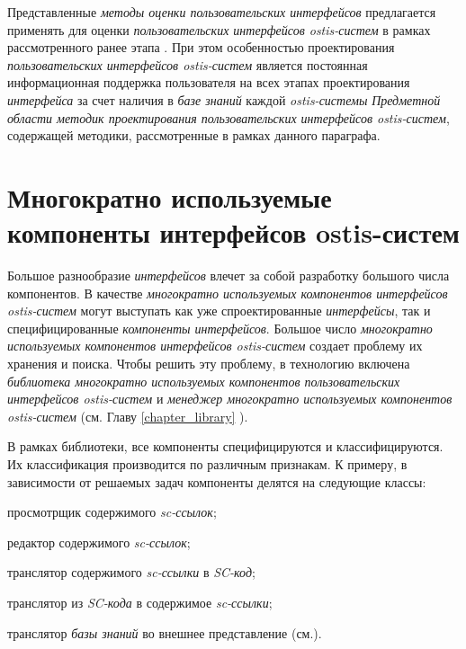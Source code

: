 {Представленные \textit{методы оценки пользовательских интерфейсов} предлагается применять для оценки \textit{пользовательских интерфейсов ostis-систем} в рамках рассмотренного ранее этапа . При этом особенностью проектирования \textit{пользовательских интерфейсов ostis-систем} является постоянная информационная поддержка пользователя на всех этапах проектирования \textit{интерфейса} за счет наличия в \textit{базе знаний} каждой \textit{ostis-системы} \textit{Предметной области методик проектирования пользовательских интерфейсов ostis-систем}, содержащей методики, рассмотренные в рамках данного параграфа.


\section{Многократно используемые компоненты интерфейсов ostis-систем}
\label{sec_reusable_UI_components}

Большое разнообразие \textit{интерфейсов} влечет за собой разработку большого числа компонентов. В качестве \textit{многократно используемых компонентов интерфейсов ostis-систем} могут выступать как уже спроектированные
\textit{интерфейсы}, так и специфицированные \textit{компоненты интерфейсов}. Большое число \textit{многократно используемых компонентов интерфейсов ostis-систем} создает проблему их хранения и поиска. Чтобы решить эту проблему, в технологию включена \textit{библиотека многократно используемых компонентов пользовательских интерфейсов ostis-систем} и \textit{менеджер многократно используемых компонентов ostis-систем} (см. Главу \ref{chapter_library} ).

В рамках библиотеки, все компоненты специфицируются и классифицируются. Их классификация производится по различным признакам. К примеру, в зависимости от решаемых задач компоненты делятся на следующие классы:

\begin{textitemize}
	\item просмотрщик содержимого \textit{sc-ссылок};
	\item редактор содержимого \textit{sc-ссылок};
	\item транслятор содержимого \textit{sc-ссылки} в \textit{SC-код};
	\item транслятор из \textit{SC-кода} в содержимое \textit{sc-ссылки};
	\item транслятор \textit{базы знаний} во внешнее представление (см.).
\end{textitemize}

}
